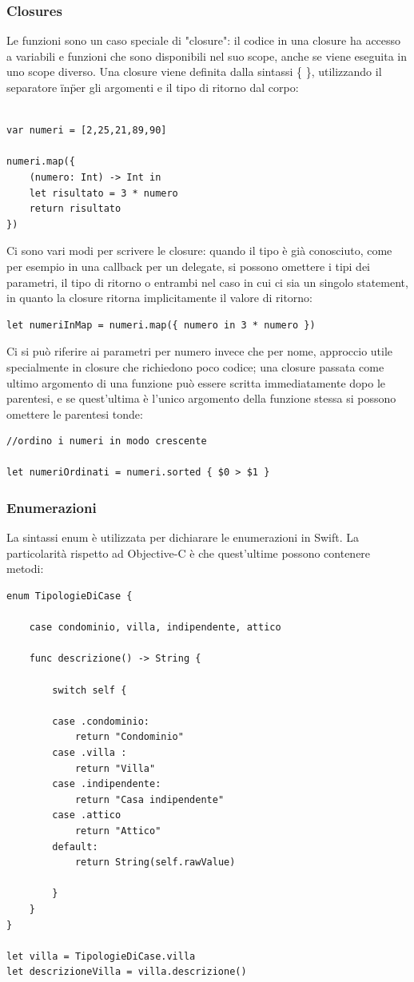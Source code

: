 \subsubsection{Closures}
Le funzioni sono un caso speciale di "closure": il codice in una closure ha accesso a variabili e funzioni che sono disponibili nel suo scope, anche se viene eseguita in uno scope diverso. Una closure viene definita dalla sintassi \{ \}, utilizzando il separatore \"in\" per gli argomenti e il tipo di ritorno dal corpo:\\\\ 
\lstset{language=[Objective]C, breakindent=40pt, breaklines}
\begin{lstlisting}
var numeri = [2,25,21,89,90]

numeri.map({
	(numero: Int) -> Int in 
	let risultato = 3 * numero 
	return risultato 
})
\end{lstlisting}
Ci sono vari modi per scrivere le closure: quando il tipo è già conosciuto, come per esempio in una callback per un delegate, si possono omettere i tipi dei parametri, il tipo di ritorno o entrambi nel caso in cui ci sia un singolo statement, in quanto la closure ritorna implicitamente il valore di ritorno:
\lstset{language=[Objective]C, breakindent=40pt, breaklines}
\begin{lstlisting}
let numeriInMap = numeri.map({ numero in 3 * numero })
\end{lstlisting}
Ci si può riferire ai parametri per numero invece che per nome, approccio utile specialmente in closure che richiedono poco codice; una closure passata come ultimo argomento di una funzione può essere scritta immediatamente dopo le parentesi, e se quest'ultima è l'unico argomento della funzione stessa si possono omettere le parentesi tonde: 
\lstset{language=[Objective]C, breakindent=40pt, breaklines}
\begin{lstlisting}
//ordino i numeri in modo crescente

let numeriOrdinati = numeri.sorted { $0 > $1 }
\end{lstlisting}
\subsubsection{Enumerazioni}
La sintassi enum è utilizzata per dichiarare le enumerazioni in Swift. La particolarità rispetto ad Objective-C è che quest'ultime possono contenere metodi:
\lstset{language=[Objective]C, breakindent=40pt, breaklines}
\begin{lstlisting}
enum TipologieDiCase {

	case condominio, villa, indipendente, attico
	
	func descrizione() -> String {
	
		switch self {
	
		case .condominio:
			return "Condominio"
		case .villa :
			return "Villa"
		case .indipendente:
			return "Casa indipendente"
		case .attico
			return "Attico"
		default: 
			return String(self.rawValue)
		
		}
	}
}

let villa = TipologieDiCase.villa
let descrizioneVilla = villa.descrizione()
\end{lstlisting}
